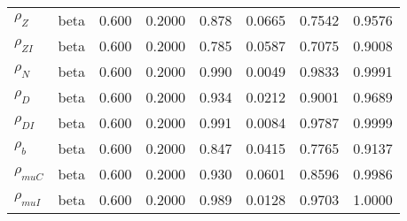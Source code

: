 \begin{center}
\begin{longtable}{llcccccc}
${\rho_Z}$ & beta &   0.600 & 0.2000 &   0.878& 0.0665 &  0.7542 &  0.9576 \\ 
${\rho_{ZI}}$ & beta &   0.600 & 0.2000 &   0.785& 0.0587 &  0.7075 &  0.9008 \\ 
${\rho_N}$ & beta &   0.600 & 0.2000 &   0.990& 0.0049 &  0.9833 &  0.9991 \\ 
${\rho_D}$ & beta &   0.600 & 0.2000 &   0.934& 0.0212 &  0.9001 &  0.9689 \\ 
${\rho_{DI}}$ & beta &   0.600 & 0.2000 &   0.991& 0.0084 &  0.9787 &  0.9999 \\ 
${\rho_b}$ & beta &   0.600 & 0.2000 &   0.847& 0.0415 &  0.7765 &  0.9137 \\ 
${\rho_{muC}}$ & beta &   0.600 & 0.2000 &   0.930& 0.0601 &  0.8596 &  0.9986 \\ 
${\rho_{muI}}$ & beta &   0.600 & 0.2000 &   0.989& 0.0128 &  0.9703 &  1.0000 \\ 
\end{longtable}
 \end{center}
